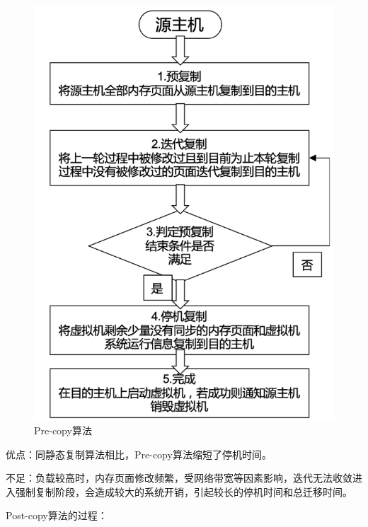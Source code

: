 \begin{figure}[htbp]
  \centering
  \includegraphics{./Figure/IMG_Chap2_4.png}
  \caption{Pre-copy算法}\label{Fig:chap2_4}
\end{figure}

优点：同静态复制算法相比，Pre-copy算法缩短了停机时间。

不足：负载较高时，内存页面修改频繁，受网络带宽等因素影响，迭代无法收敛进入强制复制阶段，会造成较大的系统开销，引起较长的停机时间和总迁移时间。

Post-copy算法的过程：

